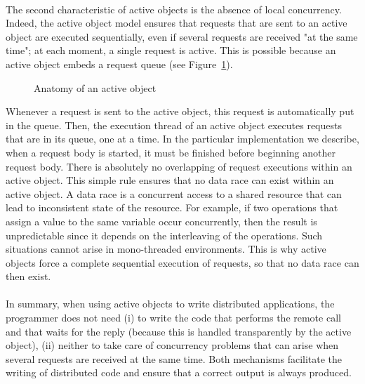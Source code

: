 \documentclass[11pt]{report}
\begin{document}
\paragraph{}
The second characteristic of active objects is the absence of local concurrency. Indeed, the active object model ensures that requests that are sent to an active object are executed sequentially, even if several requests are received "at the same time"; at each moment, a single request is active.
This is possible because an active object embeds a request queue (see Figure~\ref{fig:active_object}).
\begin{figure}[ht]
      \caption{Anatomy of an active object}
      \label{fig:active_object}
\end{figure}
Whenever a request is sent to the active object, this request is automatically put in the queue. Then, the execution thread of an active object executes requests that are in its queue, one at a time. In the particular implementation we describe, when a request body is started, it must be finished before beginning another request body. There is absolutely no overlapping of request executions within an active object.
This simple rule ensures that no data race can exist within an active object. A data race is a concurrent access to a shared resource that can lead to inconsistent state of the resource. For example, if two operations that assign a value to the same variable occur concurrently, then the result is unpredictable since it depends on the interleaving of the operations.
Such situations cannot arise in mono-threaded environments. This is why active objects force a complete sequential execution of requests, so that no data race can then exist.

\paragraph{}
In summary, when using active objects to write distributed applications, the programmer does not need (i) to write the code that performs the remote call and that waits for the reply (because this is handled transparently by the active object), (ii) neither to take care of concurrency problems that can arise when several requests are received at the same time. Both mechanisms facilitate the writing of distributed code and ensure that a correct output is always produced.
\end{document}

